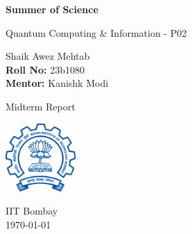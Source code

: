 \begin{titlepage}
    \begin{center}
        \vspace*{1cm}
            
        {\Huge \textbf{Summer of Science}}
            
        \vspace{0.5cm}
        {\Large Quantum Computing \& Information - P02}
            
        \vspace{1.5cm}
        \large    
        Shaik Awez Mehtab \\ \textbf{Roll No:} 23b1080 \\ \textbf{Mentor:} Kanishk Modi
            
        \vfill

        {\huge Midterm Report}
            
        \vspace{0.8cm}
            
        \includegraphics[width=0.2\textwidth]{images/iitb_logo}
            
        \large
        IIT Bombay\\
        \today
            
    \end{center}
\end{titlepage}